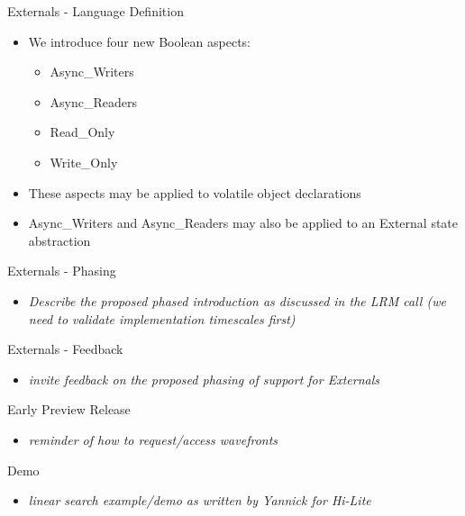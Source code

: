 \documentclass{beamer}
\begin{document}
\begin{frame}{Externals - Language Definition}

  \begin{itemize}
  \item We introduce four new Boolean aspects:
    \begin{itemize}
    \item Async_Writers
    \item Async_Readers
    \item Read_Only
    \item Write_Only
    \end{itemize}
  \item These aspects may be applied to volatile object declarations
  \item Async_Writers and Async_Readers may also be applied to an
    External state abstraction
  \end{itemize}
 
\end{frame}

\begin{frame}{Externals - Phasing}

  \begin{itemize}
  \item \emph{Describe the proposed phased introduction as discussed in the LRM call (we need to validate implementation timescales first)}
  \end{itemize}
 
\end{frame}

\begin{frame}{Externals - Feedback}

  \begin{itemize}
  \item \emph{invite feedback on the proposed phasing of support for Externals}
  \end{itemize}
 
\end{frame}

\begin{frame}{Early Preview Release}

  \begin{itemize}
  \item \emph{reminder of how to request/access wavefronts}
  \end{itemize}
 
\end{frame}

\begin{frame}{Demo}

  \begin{itemize}
  \item \emph{linear search example/demo as written by Yannick for Hi-Lite}
  \end{itemize}
 
\end{frame}
\end{document}
